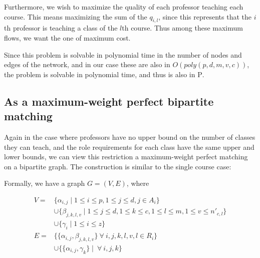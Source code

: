 Furthermore, we wish to maximize the quality of each professor teaching each course. This means maximizing the sum of the $q_{i, l}$, since this represents that the $i$th professor is teaching a class of the $l$th course. Thus among these maximum flows, we want the one of maximum cost.

Since this problem is solvable in polynomial time in the number of nodes and edges of the network, and in our case these are also in $O(poly(p, d, m, v, c))$, the problem is solvable in polynomial time, and thus is also in \textsc{P}.


\subsection{As a maximum-weight perfect bipartite matching}
Again in the case where professors have no upper bound on the number of classes they can teach, and the role requirements for each class have the same upper and lower bounds, we can view this restriction a maximum-weight perfect matching on a bipartite graph. The construction is similar to the single course case:

\begin{center}
\end{center}

Formally, we have a graph $G = (V, E)$, where

\begin{align*}
  V = & \{\alpha_{i, j} \mid 1 \le i \le p, 1 \le j \le d, j \in A_i\}\\
    & \cup \{\beta_{j, k, l, v} \mid 1 \le j \le d, 1 \le k \le c, 1 \le l \le m, 1 \le v \le n'_{c, l}\}\\
    & \cup \{\gamma_i \mid 1 \le i \le z\}\\
  E = & \{\{\alpha_{i, j}, \beta_{j, k, l, v}\}\ \forall\ i, j, k, l, v, l \in R_i\}\\
      & \cup \{\{\alpha_{i, j}, \gamma_k\} \mid \ \forall\ i, j, k\}
\end{align*}

